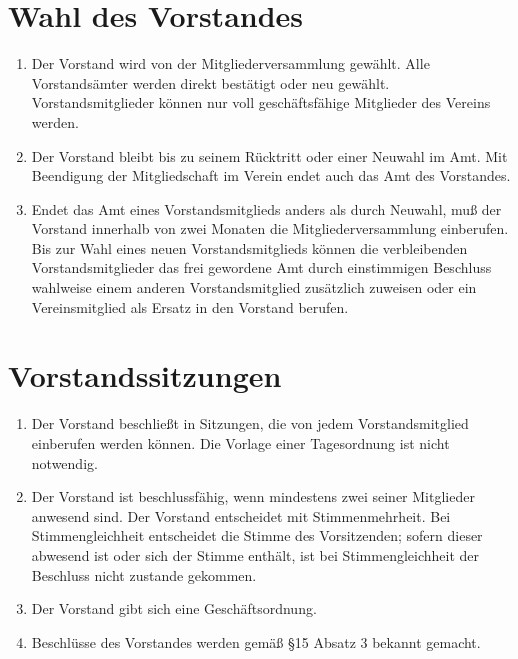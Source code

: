 \documentclass[ngerman]{scrartcl}
\begin{document}
\section{Wahl des Vorstandes} \label{sec:wahl_des_vorstandes}
\begin{enumerate}
 \item Der Vorstand wird von der Mitgliederversammlung gewählt.
 Alle Vorstandsämter werden direkt bestätigt oder neu gewählt.
 Vorstandsmitglieder können nur voll geschäftsfähige
 Mitglieder des Vereins werden.
 \item Der Vorstand bleibt bis zu seinem Rücktritt oder einer
 Neuwahl im Amt. Mit Beendigung der Mitgliedschaft im Verein
 endet auch das Amt des Vorstandes.
 \item Endet das Amt eines Vorstandsmitglieds anders als durch
 Neuwahl, muß der Vorstand innerhalb von zwei Monaten die
 Mitgliederversammlung einberufen. Bis zur Wahl eines neuen
 Vorstandsmitglieds können die verbleibenden
 Vorstandsmitglieder das frei gewordene Amt durch einstimmigen
 Beschluss wahlweise einem anderen Vorstandsmitglied
 zusätzlich zuweisen oder ein Vereinsmitglied als Ersatz in
 den Vorstand berufen.
\end{enumerate}
\section{Vorstandssitzungen} \label{sec:vorstandssitzungen}
\begin{enumerate}
 \item Der Vorstand beschließt in Sitzungen, die von jedem
 Vorstandsmitglied einberufen werden können. Die Vorlage einer
 Tagesordnung ist nicht notwendig.
 \item Der Vorstand ist beschlussfähig, wenn mindestens zwei
 seiner Mitglieder anwesend sind. Der Vorstand entscheidet mit
 Stimmenmehrheit. Bei Stimmengleichheit entscheidet die Stimme
 des Vorsitzenden; sofern dieser abwesend ist oder sich der
 Stimme enthält, ist bei Stimmengleichheit der Beschluss nicht
 zustande gekommen.
 \item Der Vorstand gibt sich eine Geschäftsordnung.
 \item Beschlüsse des Vorstandes werden gemäß §15 Absatz 3
 bekannt gemacht.
\end{enumerate}
\end{document}
